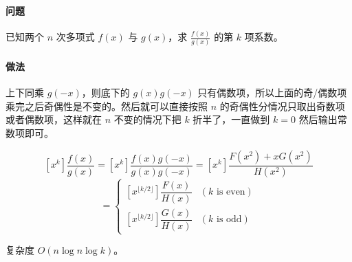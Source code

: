 \paragraph{问题} 已知两个 $n$ 次多项式 $f(x)$ 与 $g(x)$，求 $\frac {f(x)} {g(x)}$ 的第 $k$ 项系数。

\paragraph{做法} 上下同乘 $g(-x)$，则底下的 $g(x)g(-x)$ 只有偶数项，所以上面的奇/偶数项乘完之后奇偶性是不变的。然后就可以直接按照 $n$ 的奇偶性分情况只取出奇数项或者偶数项，这样就在 $n$ 不变的情况下把 $k$ 折半了，一直做到 $k = 0$ 然后输出常数项即可。

$$ [x^k]\dfrac{f(x)}{g(x)}=[x^k]\dfrac{f(x)g(-x)}{g(x)g(-x)}=[x^k]\dfrac{F(x^2)+xG(x^2)}{H(x^2)} $$
$$ =
\begin{cases}
[x^{\lfloor k/2\rfloor}]\dfrac{F(x)}{H(x)}& (k\text{ is even})\\
[x^{\lfloor k/2\rfloor}]\dfrac{G(x)}{H(x)}& (k\text{ is odd})
\end{cases} $$

复杂度 $O(n \log n \log k)$。

\inputminted{cpp}{../src/math/Bostan-Mori.cpp}
